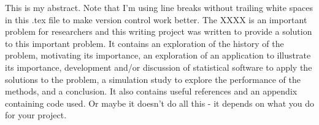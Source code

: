 \begin{doublespace}
This is my abstract. Note that I'm using line breaks without trailing white spaces in this .tex file to
make version control work better. The XXXX is an important problem for researchers and this writing
project was written to provide a solution to this important problem. It contains an exploration
of the history of the problem, motivating its importance, an exploration of an application to
illustrate its importance, development and/or discussion of statistical software to apply
the solutions to the problem, a simulation study to explore the performance of the methods,
and a conclusion. It also contains useful references and an appendix containing code used.
Or maybe it doesn't do all this - it depends on what you do for your project.
\end{doublespace}